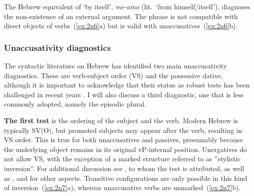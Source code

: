 \begin{exe}
\begin{xlist}
\begin{exe}
\begin{xlist}
\begin{exe}
\begin{xlist}
\begin{exe}
\begin{exe}
\begin{xlist}
		
 \z
\z 	

The Hebrew equivalent of `by itself', \emph{me-a{\ts}mo} (lit.~`from himself/itself'), diagnoses the non-existence of an external argument. The phrase is not compatible with direct objects of  verbs~(\ref{ex:2n6}a) but is valid with unaccusatives~(\ref{ex:2n6}b).
 \begin{exe}
 \ex  \label{ex:2n6}
 \begin{xlist} 
		
		
 \z
\z 


		\subsubsection{Unaccusativity diagnostics} \label{voice:tkal:nact:unacc}
The syntactic literature on Hebrew has identified two main unaccusativity diagnostics. These are verb-subject order (VS) and the possessive dative, although it is important to acknowledge that their status as robust tests has been challenged in recent years \citep{gafter14li,linzen14pd,kastner17gjgl}. I will also discuss a third diagnostic, one that is less commonly adopted, namely the episodic plural.

\textbf{The first test} is the ordering of the subject and the verb. Modern Hebrew is typically SV(O), but promoted subjects may appear after the verb, resulting in VS order. This is true for both unaccusatives and passives, presumably because the underlying object remains in its original vP-internal position. Unergatives do not allow VS, with the exception of a marked structure referred to as ''stylistic inversion''. For additional discussion see \cite{shlonsky87}, to whom the test is attributed, as well as \cite{shlonskydoron91}, \cite{borer95} and \cite{preminger10} for other aspects. Transitive configurations are only possible in this kind of inversion~(\ref{ex:2n7}a), whereas unaccusative verbs are unmarked~(\ref{ex:2n7}b).


\end{xlist}
\end{exe}
\end{xlist}
\end{exe}
\end{exe}
\end{xlist}
\end{exe}
\end{xlist}
\end{exe}
\end{xlist}
\end{exe}
